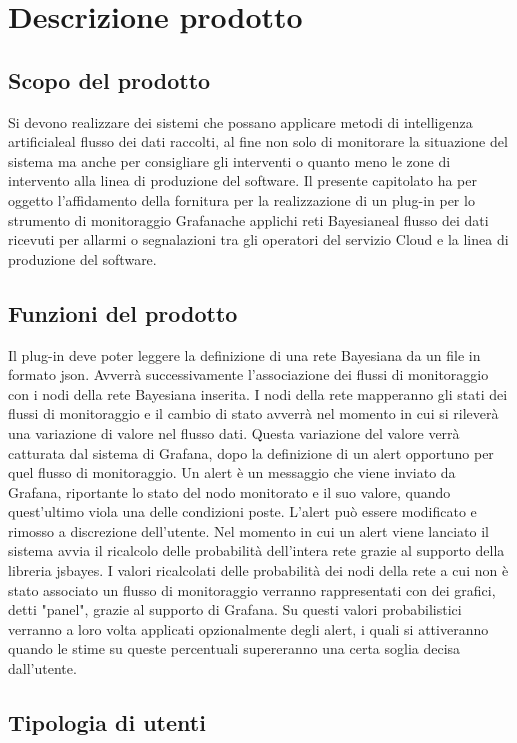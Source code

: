 \section{Descrizione prodotto}
		\subsection{Scopo del prodotto}			
Si devono realizzare dei sistemi che possano applicare metodi di intelligenza artificiale\pedice al flusso dei dati raccolti, al fine non solo di monitorare la situazione del sistema ma anche per consigliare gli interventi o quanto meno le zone di intervento alla linea di produzione del software.
Il presente capitolato ha per oggetto l'affidamento della fornitura per la
realizzazione di un plug-in per lo strumento di monitoraggio Grafana\pedice che
applichi reti Bayesiane\pedice al flusso dei dati ricevuti per allarmi o segnalazioni tra gli operatori del servizio Cloud e la linea di produzione del software.


		\subsection{Funzioni del prodotto}
Il plug-in deve poter leggere la definizione di una rete Bayesiana da un file in formato json. Avverrà successivamente l'associazione dei flussi di monitoraggio con i nodi della rete Bayesiana inserita. I nodi della rete mapperanno gli stati dei flussi di monitoraggio e il cambio di stato avverrà nel momento in cui si rileverà una variazione di valore nel flusso dati. Questa variazione del valore verrà catturata dal sistema di Grafana, dopo la definizione di un alert opportuno per quel flusso di monitoraggio. Un alert è un messaggio che viene inviato da Grafana, riportante lo stato del nodo monitorato e il suo valore, quando quest'ultimo viola una delle condizioni poste. L'alert può essere modificato e rimosso a discrezione dell'utente.
Nel momento in cui un alert viene lanciato il sistema avvia il ricalcolo delle probabilità dell'intera rete grazie al supporto della libreria jsbayes. 
I valori ricalcolati delle probabilità dei nodi della rete a cui non è stato associato un flusso di monitoraggio verranno rappresentati con dei grafici, detti "panel", grazie al supporto di Grafana.
Su questi valori probabilistici verranno a loro volta applicati opzionalmente degli alert, i quali si attiveranno quando le stime su queste percentuali supereranno una certa soglia decisa dall'utente.


		\subsection{Tipologia di utenti}

